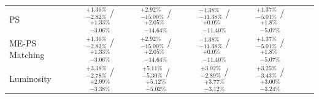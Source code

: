\begin{table}[!htbp]
\begin{center}
{\begin{tabular}{lcccccc}
PS             &  $_{-2.82\%}^{+1.36\%}$ /  $_{-3.06\%}^{+1.33\%}$   & $_{-15.00\%}^{+2.92\%}$ / $_{-14.64\%}^{+2.05\%}$  & $_{-11.38\%}^{-1.38\%}$ / $_{-11.40\%}^{+0.0\%}$  & $_{-5.01\%}^{+1.37\%}$ / $_{-5.07\%}^{+1.8\%}$  \\
ME-PS Matching             &  $_{-2.82\%}^{+1.36\%}$ /  $_{-3.06\%}^{+1.33\%}$   & $_{-15.00\%}^{+2.92\%}$ / $_{-14.64\%}^{+2.05\%}$  & $_{-11.38\%}^{-1.38\%}$ / $_{-11.40\%}^{+0.0\%}$  & $_{-5.01\%}^{+1.37\%}$ / $_{-5.07\%}^{+1.8\%}$  \\
Luminosity             &  $_{-2.78\%}^{+3.38\%}$ /  $_{-3.38\%}^{+2.99\%}$   & $_{-5.30\%}^{+5.11\%}$ / $_{-5.02\%}^{+5.12\%}$  & $_{-2.89\%}^{+3.02\%}$ / $_{-3.12\%}^{+3.77\%}$  & $_{-3.43\%}^{+3.25\%}$ / $_{-3.24\%}^{+3.00\%}$  \\    
\hline
\end{tabular}
}
\end{center}
\end{table}
